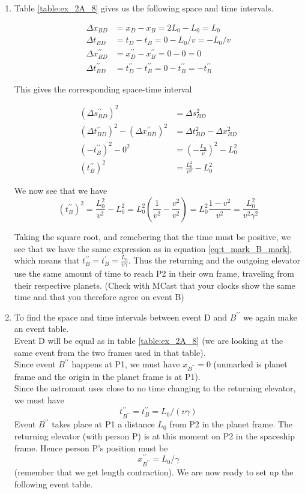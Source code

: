 \documentclass[a4paper,10pt,english]{article}
\begin{document}
\begin{enumerate}
\item Table \ref{table:ex_2A_8} gives us the following space and time intervals.

\begin{align*}
\Delta x_{BD}&=x_{D}-x_{B}=2L_{0}-L_{0}=L_{0}\\
\Delta t_{BD}&=t_{D}-t_{B}=0-L_{0}/v=-L_{0}/v\\
\Delta x^{\prime\prime}_{BD}&=x^{\prime\prime}_{D}-x^{\prime\prime}_{B}=0-0=0\\
\Delta t^{\prime\prime}_{BD}&=t^{\prime\prime}_{D}-t_{B}^{\prime\prime}=0-t_{B}^{\prime\prime}=-t_{B}^{\prime\prime}
\end{align*}

This gives the corresponding space-time interval

\begin{align*}
(\Delta s^{\prime\prime}_{BD})^{2}&=\Delta s_{BD}^{2}\\
(\Delta t^{\prime\prime}_{BD})^{2}-(\Delta x^{\prime\prime}_{BD})^{2}&=\Delta t_{BD}^{2}-\Delta x_{BD}^{2}\\
(-t_{B}^{\prime\prime})^{2}-0^{2}&=\left(-\frac{L_{0}}{v}\right)^{2}-L_{0}^{2}\\
(t_{B}^{\prime\prime})^{2}&=\frac{L_{0}^{2}}{v^{2}}-L_{0}^{2}
\end{align*}

We now see that we have \[(t_{B}^{\prime\prime})^{2}=\frac{L_{0}^{2}}{v^{2}}-L_{0}^{2}=L_{0}^{2}\left(\frac{1}{v^{2}}-\frac{v^{2}}{v^{2}}\right)=L_{0}^{2}\frac{1-v^{2}}{v^{2}}=\frac{L_{0}^{2}}{v^{2}\gamma^{2}}\]

Taking the square root, and remebering that the time must be positive, we see that we have the same expression as in equation \ref{eq:t_mark_B_mark}, which means that $t_{B}^{\prime\prime}=t_{B}^{\prime}=\frac{L_{0}}{v\gamma}$. Thus the returning and the outgoing elevator use the same amount of time to reach P2 in their own frame, traveling from their respective planets. (Check with MCast that your clocks show the same time and that you therefore agree on event B)
\item To find the space and time intervals between event D and $B^{\prime\prime}$ we again make an event table.
\\
Event D will be equal as in table \ref{table:ex_2A_8} (we are looking at the same event from the two frames used in that table). \\
Since event $B^{\prime\prime}$ happens at P1, we must have $x_{B^{\prime\prime}}=0$ (unmarked is planet frame and the origin in the planet frame is at P1).\\
Since the astronaut uses close to no time changing to the returning elevator, we must have 
\[
t^{\prime\prime}_{B^{\prime\prime}}=t^{\prime\prime}_{B}=L_{0}/(v\gamma)
\]
Event $B^{\prime\prime}$ takes place at P1 a distance $L_{0}$ from P2 in the planet frame. The returning elevator (with person P) is at this moment on P2 in the spaceship frame. Hence person P's position must be \[x^{\prime\prime}_{B^{\prime\prime}}=L_{0}/\gamma\] (remember that we get length contraction).
We are now ready to set up the following event table.


\end{enumerate}
\end{document}
